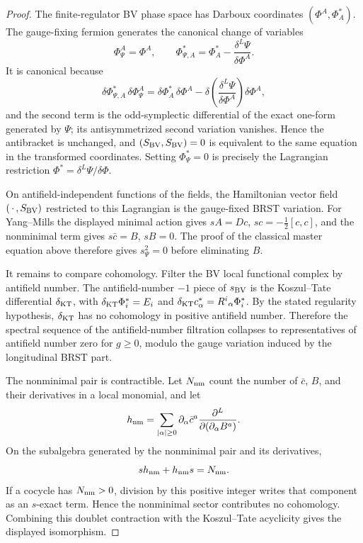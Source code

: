 \begin{proof}
The finite-regulator BV phase space has Darboux coordinates
\((\Phi^A,\Phi^*_A)\).  The gauge-fixing fermion generates the canonical
change of variables
\[
  \Phi^A_{\Psi}=\Phi^A,\qquad
  \Phi^*_{\Psi,A}=\Phi^*_A-\frac{\delta^L\Psi}{\delta\Phi^A}.
\]
It is canonical because
\[
  \delta\Phi^*_{\Psi,A}\,\delta\Phi^A_{\Psi}
  =
  \delta\Phi^*_A\,\delta\Phi^A
  -
  \delta\!\left(\frac{\delta^L\Psi}{\delta\Phi^A}\right)\delta\Phi^A ,
\]
and the second term is the odd-symplectic differential of the exact one-form
generated by \(\Psi\); its antisymmetrized second variation vanishes.  Hence
the antibracket is unchanged, and \((S_{\rm BV},S_{\rm BV})=0\) is equivalent
to the same equation in the transformed coordinates.  Setting
\(\Phi^*_{\Psi}=0\) is precisely the Lagrangian restriction
\(\Phi^*=\delta^L\Psi/\delta\Phi\).

On antifield-independent functions of the fields, the Hamiltonian vector
field \((\,\cdot\,,S_{\rm BV})\) restricted to this Lagrangian is the
gauge-fixed BRST variation.  For Yang--Mills the displayed minimal action
gives \(sA=Dc\), \(sc=-\frac12[c,c]\), and the nonminimal term gives
\(s\bar c=B\), \(sB=0\).  The proof of the classical master equation above
therefore gives \(s_\Psi^2=0\) before eliminating \(B\).

It remains to compare cohomology.  Filter the BV local functional complex by
antifield number.  The antifield-number \(-1\) piece of \(s_{\rm BV}\) is the
Koszul--Tate differential \(\delta_{\rm KT}\), with
\(\delta_{\rm KT}\Phi^*_i=E_i\) and
\(\delta_{\rm KT}c^*_\alpha=R^i{}_\alpha\Phi^*_i\).  By the stated regularity
hypothesis, \(\delta_{\rm KT}\) has no cohomology in positive antifield
number.  Therefore the spectral sequence of the antifield-number filtration
collapses to representatives of antifield number zero for \(g\ge0\), modulo
the gauge variation induced by the longitudinal BRST part.

The nonminimal pair is contractible.  Let \(N_{\rm nm}\) count the number of
\(\bar c\), \(B\), and their derivatives in a local monomial, and let
\[
  h_{\rm nm}
  =
  \sum_{|\alpha|\ge0}
  \partial_\alpha\bar c^a
  \frac{\partial^L}{\partial(\partial_\alpha B^a)} .
\]
On the subalgebra generated by the nonminimal pair and its derivatives,
\[
  s h_{\rm nm}+h_{\rm nm}s=N_{\rm nm}.
\]
If a cocycle has \(N_{\rm nm}>0\), division by this positive integer writes
that component as an \(s\)-exact term.  Hence the nonminimal sector contributes
no cohomology.  Combining this doublet contraction with the
Koszul--Tate acyclicity gives the displayed isomorphism.
\end{proof}

